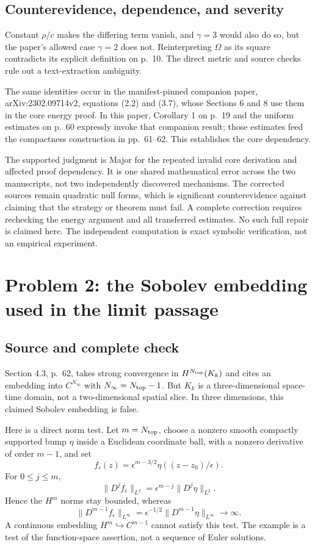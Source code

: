 \documentclass[10pt]{article}
\begin{document}
\subsection*{Counterevidence, dependence, and severity}
Constant \(\rho/c\) makes the differing term vanish, and \(\gamma=3\) would also do so, but the paper’s allowed case \(\gamma=2\) does not. Reinterpreting \(\Omega\) as its square contradicts its explicit definition on p. 10. The direct metric and source checks rule out a text-extraction ambiguity.\par
The same identities occur in the manifest-pinned companion paper, arXiv:2302.09714v2, equations (2.2) and (3.7), whose Sections 6 and 8 use them in the core energy proof. In this paper, Corollary 1 on p. 19 and the uniform estimates on p. 60 expressly invoke that companion result; those estimates feed the compactness construction in pp. 61–62. This establishes the core dependency.\par
The supported judgment is Major for the repeated invalid core derivation and affected proof dependency. It is one shared mathematical error across the two manuscripts, not two independently discovered mechanisms. The corrected sources remain quadratic null forms, which is significant counterevidence against claiming that the strategy or theorem must fail. A complete correction requires rechecking the energy argument and all transferred estimates. No such full repair is claimed here. The independent computation is exact symbolic verification, not an empirical experiment.\par
\section*{Problem 2: the Sobolev embedding used in the limit passage}
\subsection*{Source and complete check}
Section 4.3, p. 62, takes strong convergence in \(H^{N_{\rm top}}(K_k)\) and cites an embedding into \(C^{N_\infty}\) with \(N_\infty=N_{\rm top}-1\). But \(K_k\) is a three-dimensional space-time domain, not a two-dimensional spatial slice. In three dimensions, this claimed Sobolev embedding is false.\par
Here is a direct norm test. Let \(m=N_{\rm top}\), choose a nonzero smooth compactly supported bump \(\eta\) inside a Euclidean coordinate ball, with a nonzero derivative of order \(m-1\), and set \[f_\epsilon(z)=\epsilon^{m-3/2}\eta((z-z_0)/\epsilon).\] For \(0\leq j\leq m\), \[\|D^j f_\epsilon\|_{L^2}
=\epsilon^{m-j}\|D^j\eta\|_{L^2}.\] Hence the \(H^m\) norms stay bounded, whereas \[\|D^{m-1} f_\epsilon\|_{L^\infty}
=\epsilon^{-1/2}\|D^{m-1}\eta\|_{L^\infty}\longrightarrow\infty.\] A continuous embedding \(H^m\hookrightarrow C^{m-1}\) cannot satisfy this test. The example is a test of the function-space assertion, not a sequence of Euler solutions.\par
\end{document}
